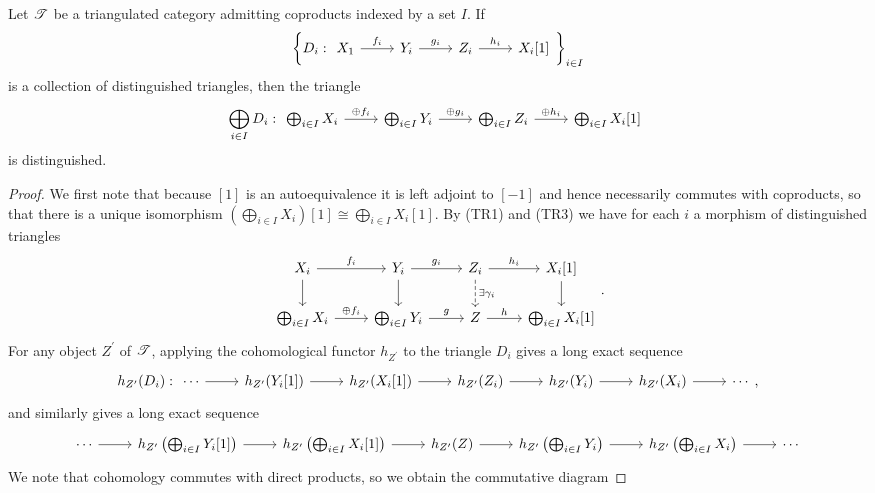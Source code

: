 \documentclass[10pt]{amsart}
\begin{document}
\begin{prop}\label{sumtriangles}
  Let $\mathscr{T}$ be a triangulated category admitting coproducts indexed by a set $I$.
  If 
  $$\left\{D_i : \begin{tikzcd}X_1 \arrow{r}{f_i} & Y_i \arrow{r}{g_i} & Z_i\arrow{r}{h_i} & X_i[1]\end{tikzcd}\right\}_{i\in I}$$ 
  is a collection of distinguished triangles, then the triangle 
  $$\bigoplus_{i \in I} D_i : \begin{tikzcd} \bigoplus_{i \in I} X_i \arrow{r}{\oplus f_i} & \bigoplus_{i \in I}Y_i \arrow{r}{\oplus g_i} & \bigoplus_{i \in I} Z_i \arrow{r}{\oplus h_i} & \bigoplus_{i \in I} X_i[1]\end{tikzcd}$$
  is distinguished.

  \begin{proof}
    We first note that because $[1]$ is an autoequivalence it is left adjoint to $[-1]$ and hence necessarily commutes with coproducts, so that there is a unique isomorphism $\left(\bigoplus_{i \in I}X_i\right)[1] \cong \bigoplus_{i \in I}X_i[1]$.
    By (TR1) and (TR3) we have for each $i$ a morphism of distinguished triangles
    $$\begin{tikzcd} 
      X_i \arrow{r}{f_i}\arrow{d} & Y_i\arrow{d}\arrow{r}{g_i} & Z_i \arrow[dashed]{d}{\exists \gamma_i}\arrow{r}{h_i} & X_i[1] \arrow{d}\\
      \bigoplus_{i \in I} X_i \arrow{r}{\oplus f_i} & \bigoplus_{i \in I}Y_i \arrow{r}{g} & Z \arrow{r}{h} & \bigoplus_{i \in I} X_i[1]
    \end{tikzcd}.$$
    For any object $Z^\prime$ of $\mathscr{T}$, applying the cohomological functor $h_{Z^\prime}$ to the triangle $D_i$ gives a long exact sequence
    $$h_{Z^\prime}(D_i) : 
    \begin{tikzcd} 
      \cdots \arrow{r} & h_{Z^\prime}(Y_i[1]) \arrow{r} & h_{Z^\prime}(X_i[1]) \arrow{r} & h_{Z^\prime}(Z_i) \arrow{r} & h_{Z^\prime}(Y_i) \arrow{r} & h_{Z^\prime}(X_i) \arrow{r} & \cdots
    \end{tikzcd},$$
    and similarly gives a long exact sequence
    $$\begin{tikzcd}
      \cdots \arrow{r} & h_{Z^\prime}\left(\bigoplus_{i \in I}Y_i[1]\right) \arrow{r} & h_{Z^\prime}\left(\bigoplus_{i \in I}X_i[1]\right) \arrow{r} & h_{Z^\prime}(Z) \arrow{r} & h_{Z^\prime}\left(\bigoplus_{i \in I}Y_i\right) \arrow{r} & h_{Z^\prime}\left(\bigoplus_{i \in I} X_i\right) \arrow{r} & \cdots
    \end{tikzcd}$$
    We note that cohomology commutes with direct products, so we obtain the commutative diagram

\end{proof}
\end{prop}
\end{document}
